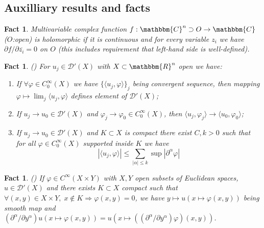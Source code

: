 \documentclass{article}
\newcommand{\nin}{\not\in}
\newtheorem{fact}[proposition]{Fact}
\theoremstyle{remark}
\begin{document}
\subsection{Auxilliary results and facts}

\begin{fact}
\label{holomorphicity-preserving:fact-holo}Multivariable complex
function $f : \mathbbm{C}^n \supset O \rightarrow \mathbbm{C}$ ($O$:open) is
holomorphic if it is continuous and for every variable $z_i$ we have $\partial
f / \partial \overline{z_i} = 0$ on $O$ (this includes requirement that
left-hand side is well-defined).
\end{fact}

\begin{fact}
\label{holomorphicity-preserving:fact-completeness}({\cite[thm.
2.1.8]{hormander1983analysis}}) For $u_j \in \mathcal{D}' (X)$ with $X \subset
\mathbbm{R}^n$ open we have:
\begin{enumerate}
  \item If $\forall \varphi \in C_0^{\infty} (X)$ we have $\{ \langle u_j,
  \varphi \rangle \}_j$ being convergent sequence, then mapping $\varphi
  \mapsto \lim_j \langle u_j, \varphi \rangle$ defines element of
  $\mathcal{D}' (X)$;
  
  \item If $u_j \rightarrow u_0 \in \mathcal{D}' (X)$ and $\varphi_j
  \rightarrow \varphi_0 \in C^{\infty}_0 (X)$, then $\langle u_j, \varphi_j
  \rangle \rightarrow \langle u_0, \varphi_0 \rangle$;
  
  \item If $u_j \rightarrow u_0 \in \mathcal{D}' (X)$ and $K \subset X$ is
  compact there exist $C, k > 0$ such that for all $\varphi \in C_0^{\infty}
  (X)$ supported inside $K$ we have
  \[ | \langle u_j, \varphi \rangle | \leqslant \sum_{| \alpha | \leqslant k}
     \sup | \partial^{\alpha} \varphi | \]
\end{enumerate}
\end{fact}

\begin{fact}
\label{holomorphicity-preserving:fact-basic}({\cite[thm.
2.1.3]{hormander1983analysis}}) If $\varphi \in C^{\infty} (X \times Y)$ with
$X, Y$ open subsets of Euclidean spaces, $u \in \mathcal{D}' (X)$ and there
exists $K \subset X$ compact such that $\forall (x, y) \in X \times Y, \; x
\nin K \Rightarrow \varphi (x, y) = 0$, we have $y \mapsto u (x \mapsto
\varphi (x, y))$ being smooth map and $(\partial^{\alpha} / \partial
y^{\alpha}) u (x \mapsto \varphi (x, y)) = u (x \mapsto ((\partial^{\alpha} /
\partial y^{\alpha}) \varphi) (x, y))$.
\end{fact}
\end{document}
